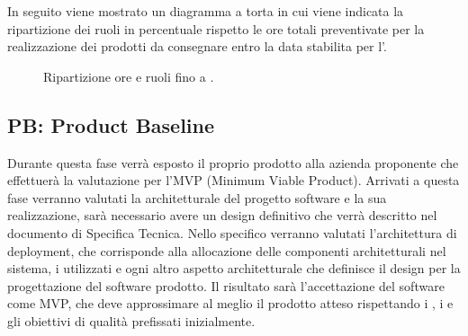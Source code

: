 \begin{table}[H]
    \centering
    \caption{Ripartizione ore e costi fino .}
    \label{tab:stima_costi_RTB} 
\end{table}

In seguito viene mostrato un diagramma a torta in cui viene indicata la ripartizione dei ruoli in percentuale rispetto le ore totali preventivate per la realizzazione dei prodotti da consegnare entro la data stabilita per l'.

\begin{figure}[H]
    \centering
    \caption{Ripartizione ore e ruoli fino a .}
    \label{fig:pie_ruoli_RTB}
\end{figure}

\subsection{PB: Product Baseline}
Durante questa fase verrà esposto il proprio prodotto alla azienda proponente che effettuerà la valutazione per l'MVP (Minimum Viable Product).
Arrivati a questa fase verranno valutati la  architetturale del progetto software e la sua realizzazione, sarà necessario avere un design definitivo 
che verrà descritto nel documento di Specifica Tecnica.
Nello specifico verranno valutati l'architettura di deployment, che corrisponde alla allocazione delle componenti architetturali nel sistema, 
i  utilizzati e ogni altro aspetto architetturale che definisce il design per la progettazione del software prodotto.
Il risultato sarà l'accettazione del software come MVP, che deve approssimare al meglio il prodotto atteso rispettando i , i  e gli obiettivi di qualità prefissati inizialmente.
